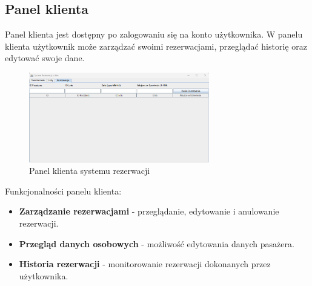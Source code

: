 \subsection{Panel klienta}
Panel klienta jest dostępny po zalogowaniu się na konto użytkownika. W panelu klienta użytkownik może zarządzać swoimi rezerwacjami, przeglądać historię oraz edytować swoje dane.

\begin{figure}[H]
\centering
\includegraphics[width=0.7\textwidth]{figures/3.png}
\caption{Panel klienta systemu rezerwacji}
\label{fig:client_panel}
\end{figure}

Funkcjonalności panelu klienta:
\begin{itemize}
\item \textbf{Zarządzanie rezerwacjami} - przeglądanie, edytowanie i anulowanie rezerwacji.
\item \textbf{Przegląd danych osobowych} - możliwość edytowania danych pasażera.
\item \textbf{Historia rezerwacji} - monitorowanie rezerwacji dokonanych przez użytkownika.
\end{itemize}
